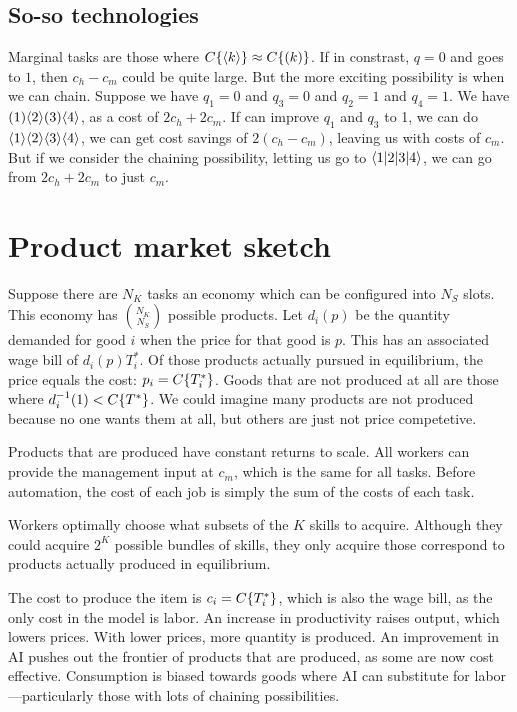 \documentclass{article}
\begin{document}
\subsection{So-so technologies}
Marginal tasks are those where $C\{ \langle k \rangle \} \approx C\{ ( k ) \}$.
If in constrast, $q = 0$ and goes to $1$, then $c_h - c_m$ could be quite large.
But the more exciting possibility is when we can chain.
Suppose we have $q_1 = 0$ and $q_3 = 0$ and $q_2 = 1$ and $q_4 = 1$.
We have $( 1 )\langle 2 \rangle( 3 )\langle 4 \rangle$, as a cost of $2c_h + 2c_m$.
If can improve $q_1$ and $q_3$ to 1, we can do $\langle 1 \rangle\langle 2 \rangle\langle 3 \rangle\langle 4 \rangle$,  we can get cost savings of $2 (c_h - c_m)$, leaving us with costs of $c_m$.
But if we consider the chaining possibility, letting us go to $\langle 1|2|3|4 \rangle $, we can go from $2c_h + 2c_m$ to just $c_m$. 

\section{Product market sketch}
Suppose there are $N_K$ tasks an economy which can be configured into $N_S$ slots.
This economy has ${N_K \choose N_S}$ possible products.
Let $d_i(p)$ be the quantity demanded for good $i$ when the price for that good is $p$.
This has an associated wage bill of $d_i(p) T^*_i$.
Of those products actually pursued in equilibrium, the price equals the cost: $p_i = C\{ T^*_i \}$. 
Goods that are not produced at all are those where $d^{-1}_i(1) < C\{ T^* \}$.
We could imagine many products are not produced because no one wants them at all, but others are just not price competetive.

Products that are produced have constant returns to scale.
All workers can provide the management input at $c_m$, which is the same for all tasks.
Before automation, the cost of each job is simply the sum of the costs of each task.

Workers optimally choose what subsets of the $K$ skills to acquire.
Although they could acquire $2^K$ possible bundles of skills, they only acquire those correspond to products actually produced in equilibrium.  

The cost to produce the item is $c_i = C\{ T^*_i \}$, which is also the wage bill, as the only cost in the model is labor.
An increase in productivity raises output, which lowers prices.
With lower prices, more quantity is produced. 
An improvement in AI pushes out the frontier of products that are produced, as some are now cost effective.
Consumption is biased towards goods where AI can substitute for labor---particularly those with lots of chaining possibilities.
\end{document}

